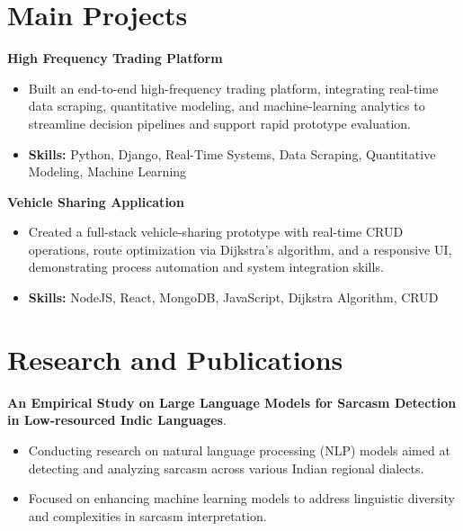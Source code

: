 \documentclass[a4paper,11pt]{article}
\begin{document}
\section{\textbf{Main Projects}}

\vspace{1mm}
  \textbf{High Frequency Trading Platform  }
\vspace{-1.5mm} %
\begin{itemize}
  \item Built an end-to-end high-frequency trading platform, integrating real-time data scraping, quantitative modeling, and machine-learning analytics to streamline decision pipelines and support rapid prototype evaluation.
\vspace{-3mm}
  \item \textbf{Skills:} Python, Django, Real-Time Systems, Data Scraping, Quantitative Modeling, Machine Learning
\end{itemize}


\vspace{1mm}
   \textbf{Vehicle Sharing Application }
\vspace{-1.5mm} %
\begin{itemize}
  \item Created a full-stack vehicle-sharing prototype with real-time CRUD operations, route optimization via Dijkstra's algorithm, and a responsive UI, demonstrating process automation and system integration skills.
\vspace{-3mm}
  \item \textbf{Skills:} NodeJS, React, MongoDB, JavaScript, Dijkstra Algorithm, CRUD
\end{itemize}



\section{\textbf{Research and Publications} \hfill }
\vspace{1mm}
  \textbf{An Empirical Study on Large Language Models for Sarcasm Detection in Low-resourced Indic Languages}.
\vspace{-1mm} %
\begin{itemize}
  \item Conducting research on natural language processing (NLP) models aimed at detecting and analyzing sarcasm across various Indian regional dialects.
\vspace{-3mm}
  \item Focused on enhancing machine learning models to address linguistic diversity and complexities in sarcasm interpretation.
\end{itemize}
\end{document}
